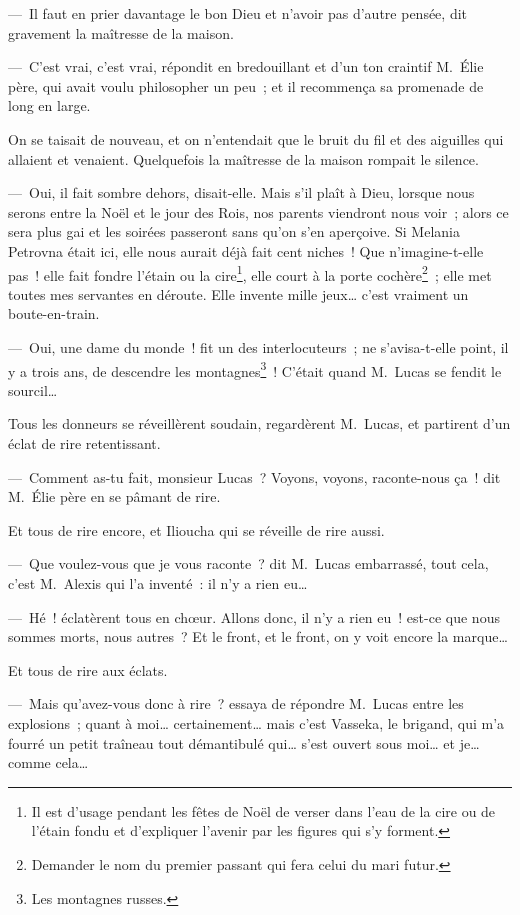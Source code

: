 \documentclass[french,twoside]{book} %
\begin{document}
— Il faut en prier davantage le bon Dieu et n’avoir pas d’autre pensée, dit gravement la maîtresse de la maison.\par
— C’est vrai, c’est vrai, répondit en bredouillant et d’un ton craintif M. Élie père, qui avait voulu philosopher un peu ; et il recommença sa promenade de long en large.\par
On se taisait de nouveau, et on n’entendait que le bruit du fil et des aiguilles qui allaient et venaient. Quelquefois la maîtresse de la maison rompait le silence.\par
— Oui, il fait sombre dehors, disait-elle. Mais s’il plaît à Dieu, lorsque nous serons entre la Noël et le jour des Rois, nos parents viendront nous voir ; alors ce sera plus gai et les soirées passeront sans qu’on s’en aperçoive. Si Melania Petrovna était ici, elle nous aurait déjà fait cent niches ! Que n’imagine-t-elle pas ! elle fait fondre l’étain ou la cire\footnote{Il est d’usage pendant les fêtes de Noël de verser dans l’eau de la cire ou de l’étain fondu et d’expliquer l’avenir par les figures qui s’y forment.}, elle court à la porte cochère\footnote{Demander le nom du premier passant qui fera celui du mari futur.} ; elle met toutes mes servantes en déroute. Elle invente mille jeux… c’est vraiment un boute-en-train.\par
— Oui, une dame du monde ! fit un des interlocuteurs ; ne s’avisa-t-elle point, il y a trois ans, de descendre les montagnes\footnote{Les montagnes russes.} ! C’était quand M. Lucas se fendit le sourcil…\par
Tous les donneurs se réveillèrent soudain, regardèrent M. Lucas, et partirent d’un éclat de rire retentissant.\par
— Comment as-tu fait, monsieur Lucas ? Voyons, voyons, raconte-nous ça ! dit M. Élie père en se pâmant de rire.\par
Et tous de rire encore, et Ilioucha qui se réveille de rire aussi.\par
— Que voulez-vous que je vous raconte ? dit M. Lucas embarrassé, tout cela, c’est M. Alexis qui l’a inventé : il n’y a rien eu…\par
— Hé ! éclatèrent tous en chœur. Allons donc, il n’y a rien eu ! est-ce que nous sommes morts, nous autres ? Et le front, et le front, on y voit encore la marque…\par
Et tous de rire aux éclats.\par
— Mais qu’avez-vous donc à rire ? essaya de répondre M. Lucas entre les explosions ; quant à moi… certainement… mais c’est Vasseka, le brigand, qui m’a fourré un petit traîneau tout démantibulé qui… s’est ouvert sous moi… et je… comme cela…\par
\end{document}
